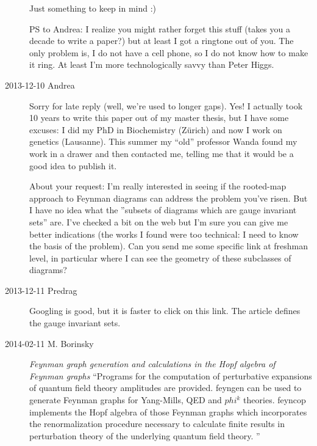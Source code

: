 \begin{description}
Just something to keep in mind :)

PS to Andrea: I realize you might rather forget this stuff (takes you a
decade to write a paper?) but at least I got a ringtone out of you. The
only problem is, I do not have a cell phone, so I do not know how to make
it ring. At least I'm more technologically savvy than
{Peter Higgs}.

\item[2013-12-10  \HREF{https://sites.google.com/site/andreaprunotto/} {Andrea}]
Sorry for late reply (well, we're used to longer gaps). Yes! I actually
took 10 years to write this paper out of my master thesis, but I have
some excuses: I did my PhD in Biochemistry (Z\"urich) and now I work on
genetics (Lausanne). This summer my ``old'' professor Wanda found my work
in a drawer and then contacted me, telling me that it would be a good
idea to publish it.

About your request: I'm really interested in seeing if the rooted-map
approach to Feynman diagrams can address the problem you've risen. But I
have no idea what the ''subsets of diagrams which are gauge invariant
sets'' are. I've checked a bit on the web but I'm sure you can give me
better indications (the works I found were too technical: I need to know
the basis of the problem). Can you send me some specific link at freshman
level, in particular where I can see the geometry of these subclasses of
diagrams?

\item[2013-12-11  Predrag]
Googling is good, but it is faster to click on
{this link}. The article defines the gauge invariant sets.

\item[2014-02-11 M. Borinsky]
\emph{Feynman graph generation and calculations in the Hopf algebra of
Feynman graphs}
``Programs for the computation of perturbative expansions of quantum
field theory amplitudes are provided. feyngen can be used to generate
Feynman graphs for Yang-Mills, QED and $phi^k$ theories. feyncop
implements the Hopf algebra of those Feynman graphs which incorporates
the renormalization procedure necessary to calculate finite results in
perturbation theory of the underlying quantum field theory. ''


\end{description}
